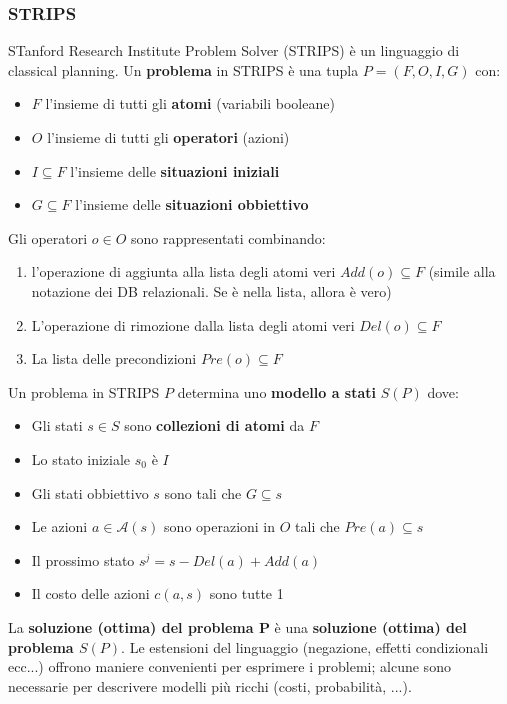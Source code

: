 \documentclass[12pt]{article}
\begin{document}
\subsubsection{STRIPS}
STanford Research Institute Problem Solver (STRIPS) è un linguaggio di classical planning.
Un \textbf{problema} in STRIPS è una tupla $P = (F, O, I ,G)$ con:
\begin{itemize}
    \item $F$ l'insieme di tutti gli \textbf{atomi} (variabili booleane)
    \item $O$ l'insieme di tutti gli \textbf{operatori} (azioni)
    \item $I \subseteq F$ l'insieme delle \textbf{situazioni iniziali}
    \item $G \subseteq F$ l'insieme delle \textbf{situazioni obbiettivo}
\end{itemize}
Gli operatori $o \in O$ sono rappresentati combinando:
\begin{enumerate}
    \item l'operazione di aggiunta alla lista degli atomi veri $Add(o) \subseteq F$ (simile alla notazione dei DB relazionali. Se è nella lista, allora è vero)
    \item L'operazione di rimozione dalla lista degli atomi veri $Del(o) \subseteq F$
    \item La lista delle precondizioni $Pre(o) \subseteq F$
\end{enumerate}
Un problema in STRIPS $P$ determina uno \textbf{modello a stati} $S(P)$ dove:
\begin{itemize}
    \item Gli stati $s \in S$ sono \textbf{collezioni di atomi} da $F$
    \item Lo stato iniziale $s_0$ è $I$
    \item Gli stati obbiettivo $s$ sono tali che $G \subseteq s$
    \item Le azioni $a \in \mathcal{A}(s)$ sono operazioni in $O$ tali che $Pre(a) \subseteq s$
    \item Il prossimo stato $s^j = s - Del(a) + Add(a)$
    \item Il costo delle azioni $c(a,s)$ sono tutte 1
\end{itemize}
La \textbf{soluzione (ottima) del problema P} è una \textbf{soluzione (ottima) del problema $S(P)$}.
Le estensioni del linguaggio (negazione, effetti condizionali ecc...) offrono maniere convenienti per esprimere i problemi; alcune sono necessarie per descrivere modelli più ricchi (costi, probabilità, ...).
\end{document}
